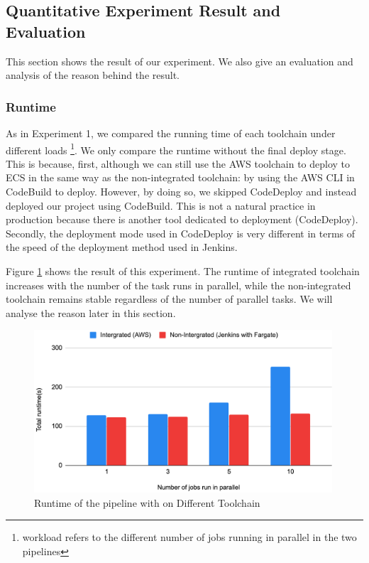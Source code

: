 \subsection{Quantitative Experiment Result and Evaluation}
This section shows the result of our experiment. We also give an evaluation and analysis of the reason behind the result.
\subsubsection{Runtime}
As in Experiment 1, we compared the running time of each toolchain under different loads \footnote{ workload refers to the different number of jobs running in parallel in the two pipelines}. We only compare the runtime without the final deploy stage. This is because, first, although we can still use the AWS toolchain to deploy to ECS in the same way as the non-integrated toolchain: by using the AWS CLI in CodeBuild to deploy. However, by doing so, we skipped CodeDeploy and instead deployed our project using CodeBuild. This is not a natural practice in production because there is another tool dedicated to deployment (CodeDeploy). Secondly, the deployment mode used in CodeDeploy is very different in terms of the speed of the deployment method used in Jenkins. 
\par
Figure \ref{fig:compareaws} shows the result of this experiment. The runtime of integrated toolchain increases with the number of the task runs in parallel, while the non-integrated toolchain remains stable regardless of the number of parallel tasks. We will analyse the reason later in this section.
\begin{figure}[!h]
    \centering
    \includegraphics[width=0.99\textwidth]{pics/compare-aws.png}
    \caption{Runtime of the pipeline with on Different Toolchain}
    \label{fig:compareaws}
    \end{figure}
